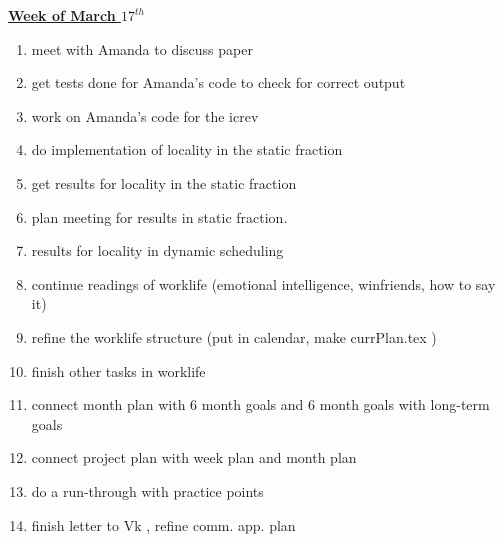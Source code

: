 \underline{\textbf{Week of March $17^{th}$}} \\
\begin{enumerate}
\item meet with Amanda to discuss paper
\item get tests done for Amanda's code to check for correct output
\item work on Amanda's code for the icrev

\item do implementation of locality in the static fraction
\item get results for locality in the static fraction
\item plan meeting for results in static fraction.
\item results for locality in dynamic scheduling

\item continue readings of worklife (emotional intelligence, winfriends, how to say it)
\item refine the worklife structure (put in calendar, make currPlan.tex )

\item finish other tasks in worklife
\item connect month plan with 6 month goals and 6 month goals with long-term goals
\item connect project plan with week plan and month plan
\item do a run-through with practice points

\item finish letter to Vk , refine comm. app. plan

\end{enumerate}

